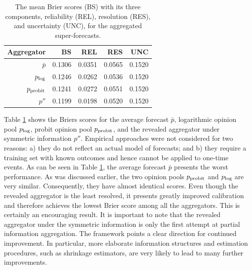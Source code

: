 \documentclass[12pt]{article}
\theoremstyle{definition}
\theoremstyle{definition}
\def\probit{p_{\rm probit}}
\def\plog{p_{\rm log}}
\begin{document}
 
\begin{table}[t]
\centering
\caption{The mean Brier scores (BS) with its three components, reliability (REL), resolution (RES), and uncertainty (UNC), for the aggregated super-forecasts.}
\begin{tabular}{rrrrr}
  \hline\hline
Aggregator & BS & REL & RES & UNC \\ 
  \hline
$\bar{p}$ & 0.1306 & 0.0351 & 0.0565 & 0.1520 \\ 
 $\plog$ & 0.1246 & 0.0262 & 0.0536 & 0.1520 \\ 
 $\probit$ & 0.1241 & 0.0272 & 0.0551 & 0.1520 \\ 
 $p''$ & 0.1199 & 0.0198 & 0.0520 & 0.1520 \\ 
   \hline
\end{tabular}
\label{BrierTable}
\end{table}

Table \ref{BrierTable} shows the Briers scores for the average
forecast $\bar{p}$, logarithmic opinion pool $\plog$, probit opinion
pool $\probit$, and the revealed aggregator under symmetric
information $p''$. Empirical approaches were not considered for two
reasons: a) they do not reflect an actual model of forecasts; and b)
they require a training set with known outcomes and hence cannot be
applied to one-time events. As can be seen in Table \ref{BrierTable},
the average forecast $\bar{p}$ presents the worst performance. As was
discussed earlier, the two opinion pools $\probit$ and $\plog$ are
very similar. Consequently, they have almost identical scores. Even
though the revealed aggregator is the least resolved, it presents
greatly improved calibration and therefore achieves the lowest Brier
score among all the aggregators. This is certainly an encouraging
result. It is important to note that the revealed aggregator
under the symmetric information is only the first attempt at partial
information aggregation. The framework points a clear direction for continued improvement. In particular, more elaborate information structures and
estimation procedures, such as shrinkage estimators, are very likely to lead to many further
improvements.

\end{document}
